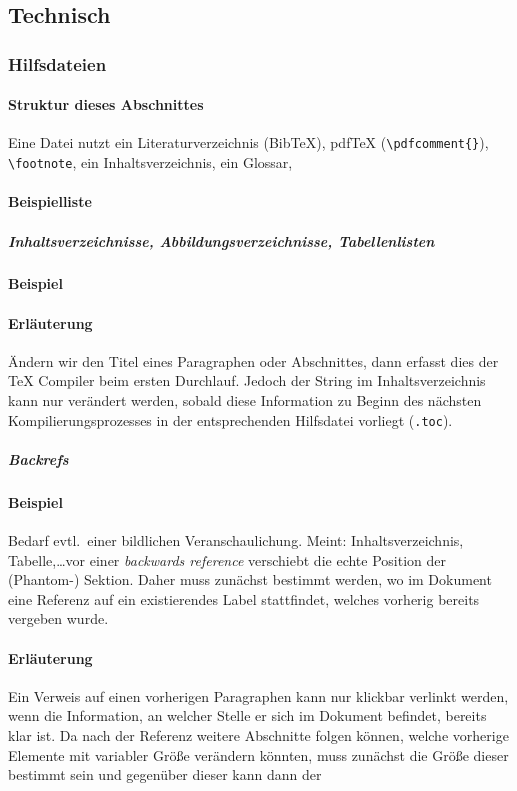 \subsection{Technisch}\label{problems:advanced}
\subsubsection{Hilfsdateien}%
\paragraph{Struktur dieses Abschnittes}
Eine Datei nutzt ein Literaturverzeichnis (Bib\TeX{}), pdf\TeX{} (\verb|\pdfcomment{}|), \verb|\footnote|, ein Inhaltsverzeichnis, ein Glossar, 

\paragraph{Beispielliste}
\subparagraph*{Inhaltsverzeichnisse, Abbildungsverzeichnisse, Tabellenlisten}
\paragraph*{Beispiel}
\paragraph*{Erläuterung}
Ändern wir den Titel eines Paragraphen oder Abschnittes, dann erfasst dies der \TeX{} Compiler beim ersten Durchlauf. Jedoch der String im Inhaltsverzeichnis kann nur verändert werden, sobald diese Information zu Beginn des nächsten Kompilierungsprozesses in der entsprechenden Hilfsdatei vorliegt (\texttt{.toc}).

\subparagraph{Backrefs}
\paragraph*{Beispiel}
Bedarf evtl.\ einer bildlichen Veranschaulichung. Meint: Inhaltsverzeichnis, Tabelle,\ldots vor einer \textit{backwards reference} verschiebt die echte Position der (Phantom-) Sektion. Daher muss zunächst bestimmt werden, wo im Dokument eine Referenz auf ein existierendes Label stattfindet, welches vorherig bereits vergeben wurde.
\paragraph*{Erläuterung}
Ein Verweis auf einen vorherigen Paragraphen kann nur klickbar verlinkt werden, wenn die Information, an welcher Stelle er sich im Dokument befindet, bereits klar ist. Da nach der Referenz weitere Abschnitte folgen können, welche vorherige Elemente mit variabler Größe verändern könnten, muss zunächst die Größe dieser bestimmt sein und gegenüber dieser kann dann der 


